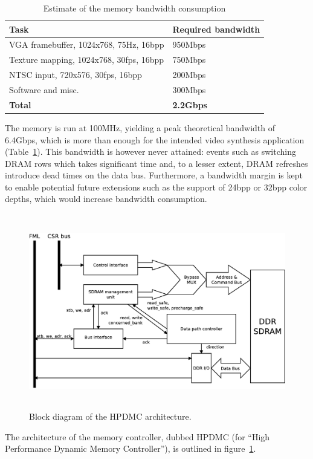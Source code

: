\documentclass[a4paper,11pt]{kthesis}
\begin{document}
\begin{table}
\centering
\begin{tabular}{|l|l|}
\hline
\textbf{Task} & \textbf{Required bandwidth} \\
\hline
VGA framebuffer, 1024x768, 75Hz, 16bpp & 950Mbps \\
\hline
Texture mapping, 1024x768, 30fps, 16bpp & 750Mbps \\
\hline
NTSC input, 720x576, 30fps, 16bpp & 200Mbps \\
\hline
Software and misc. & 300Mbps \\
\hline
\textbf{Total} & \textbf{2.2Gbps} \\
\hline
\end{tabular}
\label{tab:membw}
\caption{Estimate of the memory bandwidth consumption}
\end{table}

The memory is run at 100MHz, yielding a peak theoretical bandwidth of 6.4Gbps, which is more than enough for the intended video synthesis application (Table~\ref{tab:membw}). This bandwidth is however never attained: events such as switching DRAM rows which takes significant time and, to a lesser extent, DRAM refreshes introduce dead times on the data bus. Furthermore, a bandwidth margin is kept to enable potential future extensions such as the support of 24bpp or 32bpp color depths, which would increase bandwidth consumption.

\begin{figure}[H]
\centering
\includegraphics[height=85mm]{hpdmc_block.eps}
\caption{Block diagram of the HPDMC architecture.}\label{fig:hpdmc_block}
\end{figure}

The architecture of the memory controller, dubbed HPDMC (for ``High Performance Dynamic Memory Controller''), is outlined in figure~\ref{fig:hpdmc_block}.
\end{document}
